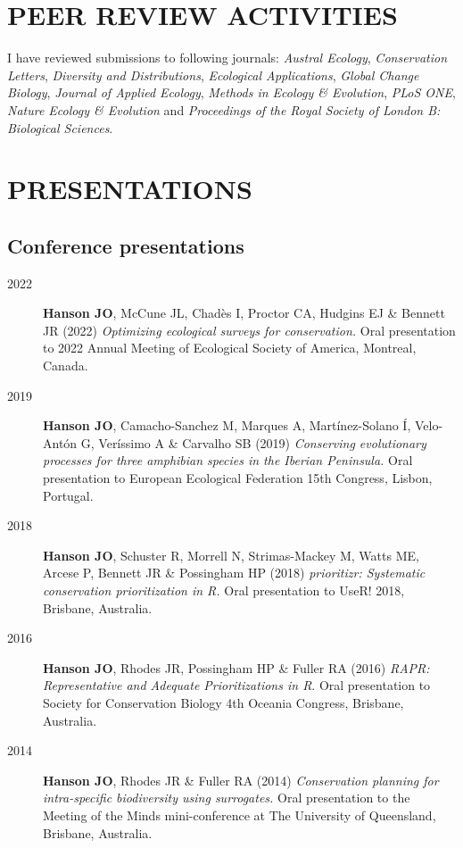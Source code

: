 \documentclass[12pt,a4paper]{article}
\begin{document}
\clearpage

\section*{PEER REVIEW ACTIVITIES}

I have reviewed submissions to following journals: \textit{Austral Ecology}, \textit{Conservation Letters}, \textit{Diversity and Distributions}, \textit{Ecological Applications}, \textit{Global Change Biology}, \textit{Journal of Applied Ecology}, \textit{Methods in Ecology \& Evolution}, \textit{PLoS ONE}, \textit{Nature Ecology \& Evolution} and \textit{Proceedings of the Royal Society of London B: Biological Sciences}.

\section*{PRESENTATIONS}
\subsection*{Conference presentations}
\begin{description}

\item[2022] \textbf{Hanson JO}, McCune JL, Chadès I, Proctor CA, Hudgins EJ \& Bennett JR (2022) \textit{Optimizing ecological surveys for conservation.} Oral presentation to 2022 Annual Meeting of Ecological Society of America, Montreal, Canada.

\item[2019] \textbf{Hanson JO}, Camacho-Sanchez M, Marques A, Martínez-Solano Í, Velo-Antón G, Veríssimo A \& Carvalho SB (2019) \textit{Conserving evolutionary processes for three amphibian species in the Iberian Peninsula.} Oral presentation to European Ecological Federation 15th Congress, Lisbon, Portugal.

\item[2018] \textbf{Hanson JO}, Schuster R, Morrell N, Strimas-Mackey M, Watts ME, Arcese P, Bennett JR \& Possingham HP (2018) \textit{prioritizr: Systematic conservation prioritization in R.} Oral presentation to UseR! 2018, Brisbane, Australia.

\item[2016] \textbf{Hanson JO}, Rhodes JR, Possingham HP \& Fuller RA (2016) \textit{RAPR: Representative and Adequate Prioritizations in R}. Oral presentation to Society for Conservation Biology 4th Oceania Congress, Brisbane, Australia.

\item[2014] \textbf{Hanson JO}, Rhodes JR \& Fuller RA (2014) \textit{Conservation planning for intra-specific biodiversity using surrogates.} Oral presentation to the Meeting of the Minds mini-conference at The University of Queensland, Brisbane, Australia.

\end{description}
\end{document}
